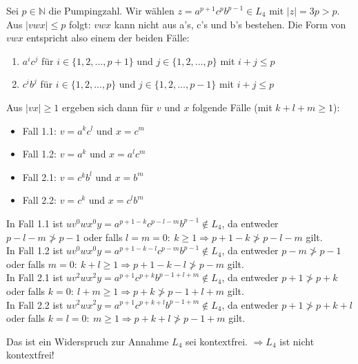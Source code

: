 \begin{teile}
	Sei $p \in \mathbb{N}$ die Pumpingzahl. Wir wählen $z = a^{p+1}c^pb^{p-1} \in L_4$ mit $|z| = 3p > p$.\\
	Aus $|vwx| \leq p$ folgt: $vwx$ kann nicht aus a's, c's und b's bestehen. Die Form von $vwx$ entspricht also einem der beiden Fälle:
	\begin{enumerate}
		\item $a^ic^j$ für $i \in \{1,2,...,p+1\}$ und $j \in \{1,2,...,p\}$ mit $i+j \leq p$
		\item $c^ib^j$ für $i \in \{1,2,...,p\}$ und $j \in \{1,2,...,p-1\}$ mit $i+j \leq p$
	\end{enumerate}
	Aus $|vx| \geq 1$ ergeben sich dann für $v$ und $x$ folgende Fälle (mit $k+l+m  \geq 1$):
	\begin{itemize}
		\item Fall 1.1: $v=a^kc^l$ und $x=c^m$
		\item Fall 1.2: $v=a^k$ und $x=a^lc^m$
		\item Fall 2.1: $v=c^kb^l$ und $x=b^m$
		\item Fall 2.2: $v=c^k$ und $x=c^lb^m$
	\end{itemize}
	In Fall 1.1 ist $uv^0wx^0y=a^{p+1-k}c^{p-l-m}b^{p-1} \notin L_4$, da entweder $p-l-m \ngtr p-1$ oder falls $l=m=0:\ k\geq 1 \Rightarrow p+1-k \ngtr p-l-m$ gilt.\\
	In Fall 1.2 ist $uv^0wx^0y=a^{p+1-k-l}c^{p-m}b^{p-1} \notin L_4$, da entweder $p-m \ngtr p-1$ oder falls $m=0:\ k+l\geq 1 \Rightarrow p+1-k-l \ngtr p-m$ gilt.\\
	In Fall 2.1 ist $uv^2wx^2y=a^{p+1}c^{p+k}b^{p-1+l+m} \notin L_4$, da entweder $p+1 \ngtr p+k$ oder falls $k=0:\ l+m\geq 1 \Rightarrow p+k \ngtr p-1+l+m$ gilt.\\
	In Fall 2.2 ist $uv^2wx^2y=a^{p+1}c^{p+k+l}b^{p-1+m} \notin L_4$, da entweder $p+1 \ngtr p+k+l$ oder falls $k=l=0:\ m\geq 1 \Rightarrow p+k+l \ngtr p-1+m$ gilt.
	
	Das ist ein Widerspruch zur Annahme $L_4$ sei kontextfrei. $\Rightarrow L_4$ ist nicht kontextfrei!
	
\end{teile}


\newpage
